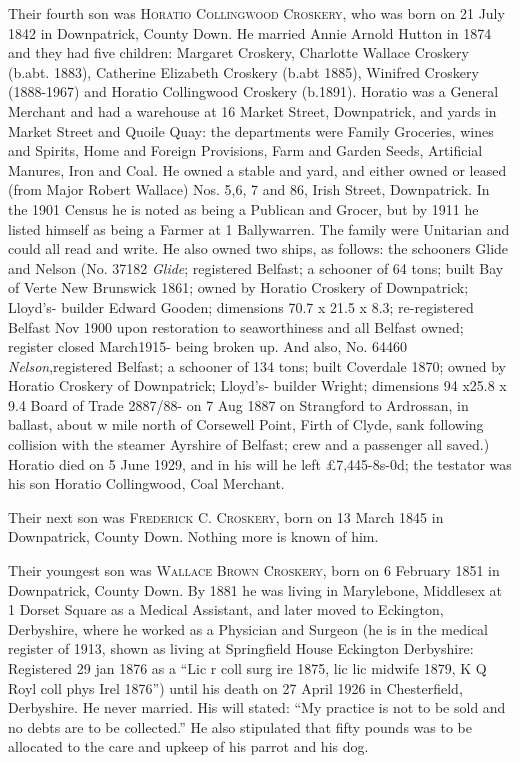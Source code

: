 Their fourth son was \textsc{Horatio Collingwood Croskery}, who was born on	21 July 1842 in Downpatrick, County Down. He married Annie Arnold Hutton in 1874 and they had five children: Margaret Croskery, Charlotte Wallace Croskery (b.abt. 1883), 
Catherine Elizabeth Croskery (b.abt 1885), Winifred Croskery (1888-1967) and Horatio Collingwood Croskery (b.1891).  Horatio was a General Merchant and had a warehouse at 16 Market Street, Downpatrick, and yards in Market Street and Quoile Quay: the departments were Family Groceries, wines and Spirits, Home and Foreign Provisions, Farm and Garden Seeds, Artificial Manures, Iron and Coal. He owned a stable and yard, and either owned or leased (from Major Robert Wallace) Nos. 5,6, 7 and 86, Irish Street, Downpatrick. In the 1901 Census he is noted as being a Publican and Grocer, but by 1911 he listed himself as being a Farmer at 1 Ballywarren. The family were Unitarian and could all read and write. He also owned two ships, as follows:  the schooners Glide and Nelson (No. 37182 \textit{Glide}; registered Belfast; a schooner of 64 tons; built Bay of Verte New Brunswick 1861; owned by Horatio Croskery of Downpatrick; Lloyd’s- builder Edward Gooden; dimensions 70.7 x 21.5 x 8.3; re-registered Belfast Nov 1900 upon restoration to seaworthiness and all Belfast owned; register closed March1915- being broken up. And also, No. 64460 \textit{Nelson},registered Belfast; a schooner of 134 tons; built Coverdale 1870; owned by Horatio Croskery of Downpatrick; Lloyd’s- builder Wright; dimensions 94 x25.8 x 9.4 Board of Trade 2887/88- on 7 Aug 1887 on Strangford to Ardrossan, in ballast, about w mile north of Corsewell Point, Firth of Clyde, sank following collision with the steamer Ayrshire of Belfast; crew and a passenger all saved.)   Horatio died on 5 June 1929, and in his will he left £7,445-8s-0d; the testator was his son Horatio Collingwood, Coal Merchant. 

Their next son was \textsc{Frederick C. Croskery}, born on 13 March 1845 in Downpatrick, County Down. Nothing more is known of him.

Their youngest son was \textsc{Wallace Brown Croskery}, born on 6 February 1851 in Downpatrick, County Down.  By 1881 he was living in Marylebone, Middlesex at 1 Dorset Square as a Medical Assistant, and later moved to Eckington, Derbyshire, where he worked as a Physician and Surgeon  (he is in the medical register of 1913, shown as living at Springfield House Eckington Derbyshire: Registered 29 jan 1876 as a ``Lic r coll surg ire 1875, lic lic midwife 1879, K Q Royl coll phys Irel 1876'') until his death on 27 April 1926 in Chesterfield, Derbyshire. He never married.  His will stated: ``My practice is not to be sold and no debts are to be collected.''  He also stipulated that fifty pounds was to be allocated to the care and upkeep of his parrot and his dog.



